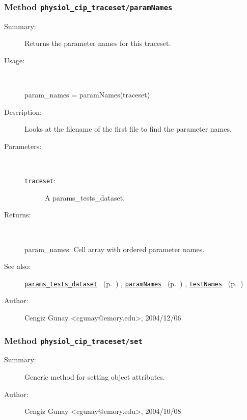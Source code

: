 \subsubsection[Method \texttt{paramNames}]{Method \texttt{physiol\_cip\_traceset/paramNames}}%
%
\label{ref_physiol_cip_traceset__paramNames}%
\hypertarget{ref_physiol_cip_traceset__paramNames}{}%
\begin{description}
\item[Summary:]Returns the parameter names for this traceset.
%
\item[Usage:]~%
\begin{lyxcode}%
param\_names = paramNames(traceset)
%
\end{lyxcode}%
%
\item[Description:]%
Looks at the filename of the first file to find the parameter names.
\item[Parameters:]~
\begin{description}%
\item[\texttt{traceset}:]
 A params\_tests\_dataset.
\end{description}%
%
\item[Returns:
]~

	param\_names: Cell array with ordered parameter names.
%
%
\item[See also:]%
\hyperlink{ref_params_tests_dataset}{\texttt{params\_tests\_dataset}}%
\ (p.~\pageref{ref_params_tests_dataset})%
%
, \hyperlink{ref_paramNames}{\texttt{paramNames}}%
\ (p.~\pageref{ref_paramNames})%
%
, \hyperlink{ref_testNames}{\texttt{testNames}}%
\ (p.~\pageref{ref_testNames})%
%
%
\item[Author:]%
Cengiz Gunay <cgunay@emory.edu>, 2004/12/06
%
\end{description}
\methodline%
\subsubsection[Method \texttt{set}]{Method \texttt{physiol\_cip\_traceset/set}}%
%
\label{ref_physiol_cip_traceset__set}%
\hypertarget{ref_physiol_cip_traceset__set}{}%
\begin{description}
\item[Summary:]Generic method for setting object attributes.
%
%
%
%
%
%
%
\item[Author:]%
Cengiz Gunay <cgunay@emory.edu>, 2004/10/08
%
\end{description}
\methodline%
